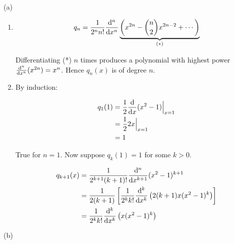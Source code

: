 \documentclass[a4paper]{article}
\begin{document}
(a)
\begin{enumerate}
	\item 
	
	\[ q_{n} = \frac{1}{2^{n} n!} \frac{\mathrm{d}^{n} }{\mathrm{d} x^{n}} \underbrace{\left(  x^{2n} - \binom{n}{2} x^{2n - 2} + \cdots  \right)}_{(*)}    \]
	
	Differentiating (*) $ n $ times produces a polynomial with highest power $ \frac{\mathrm{d}^{n} }{\mathrm{d} x^{n} } (x^{2n}) = x^{n} $. Hence $ q_{n}(x) $ is of degree $ n $.
	
	\item By induction: 
	
	\begin{align*}
	 q_{1}(1) & = \frac{1}{2} \frac{\mathrm{d} }{\mathrm{d} x} (x^{2} - 1) \Big|_{x=1} \\
	& = \frac{1}{2} 2x \Big|_{x=1} \\
	& = 1
	\end{align*}
	
	True for $ n = 1 $. Now suppose $ q_{k}(1) = 1 $ for some $ k > 0 $.
	
	\begin{align*}
	q_{k+1}(x) & = \frac{1}{2^{k+1} (k+1)!} \frac{\mathrm{d}^{n} }{\mathrm{d} x^{k+1}} (x^{2} - 1)^{k+1}   \\
	& =  \frac{1}{2 (k+1)} \left[  \frac{1}{2^{k} k!} \frac{\mathrm{d}^{k} }{\mathrm{d} x^{k}} \left(  2(k+1)x(x^{2} - 1)^{k}  \right)   \right]  \\
	& =  \frac{1}{2^{k} k!} \frac{\mathrm{d}^{k} }{\mathrm{d} x^{k}} \left( x(x^{2} - 1)^{k}  \right) 
	\end{align*}
	
	
	
\end{enumerate}


(b)
\end{document}
